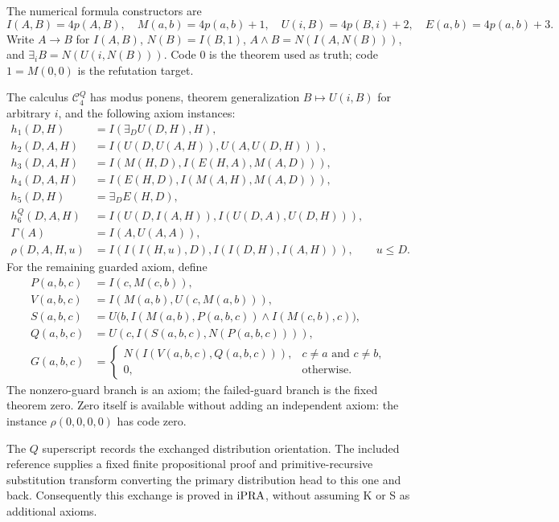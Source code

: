 The numerical formula constructors are
\[
 I(A,B)=4p(A,B),\quad M(a,b)=4p(a,b)+1,\quad
 U(i,B)=4p(B,i)+2,\quad E(a,b)=4p(a,b)+3.
\]
Write $A\to B$ for $I(A,B)$,
$N(B)=I(B,1)$,
$A\wedge B=N(I(A,N(B)))$, and
$\exists_i B=N(U(i,N(B)))$.
Code $0$ is the theorem used as truth; code $1=M(0,0)$ is the
refutation target.

The calculus $\mathcal C^Q_4$ has modus ponens, theorem
generalization $B\mapsto U(i,B)$ for arbitrary $i$, and the following
axiom instances:
\begin{align*}
 h_1(D,H)&=I(\exists_D U(D,H),H),\\
 h_2(D,A,H)&=I(U(D,U(A,H)),U(A,U(D,H))),\\
 h_3(D,A,H)&=I(M(H,D),I(E(H,A),M(A,D))),\\
 h_4(D,A,H)&=I(E(H,D),I(M(A,H),M(A,D))),\\
 h_5(D,H)&=\exists_D E(H,D),\\
 h_6^Q(D,A,H)&=I(U(D,I(A,H)),I(U(D,A),U(D,H))),\\
 \Gamma(A)&=I(A,U(A,A)),\\
 \rho(D,A,H,u)&=I(I(I(H,u),D),I(I(D,H),I(A,H))),
                    \qquad u\le D.
\end{align*}
For the remaining guarded axiom, define
\begin{align*}
 P(a,b,c)&=I(c,M(c,b)),\\
 V(a,b,c)&=I(M(a,b),U(c,M(a,b))),\\
 S(a,b,c)&=U\bigl(b,I(M(a,b),P(a,b,c))\wedge I(M(c,b),c)\bigr),\\
 Q(a,b,c)&=U(c,I(S(a,b,c),N(P(a,b,c)))),\\
 G(a,b,c)&=
 \begin{cases}
 N(I(V(a,b,c),Q(a,b,c))),&c\ne a\text{ and }c\ne b,\\
 0,&\text{otherwise}.
 \end{cases}
\end{align*}
The nonzero-guard branch is an axiom; the failed-guard branch is the
fixed theorem zero. Zero itself is available without adding an
independent axiom: the instance $\rho(0,0,0,0)$ has code zero.

The $Q$ superscript records the exchanged distribution orientation.
The included reference  supplies a fixed
finite propositional proof and primitive-recursive substitution
transform converting the primary distribution head to this one and
back. Consequently this exchange is proved in $\mathrm{iPRA}$, without
assuming K or S as additional axioms.


